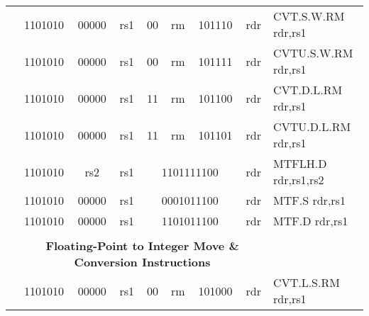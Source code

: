\begin{table}[p]
\begin{small}
\begin{center}
\begin{tabular}{rcccccccccccl}
&
\multicolumn{2}{|c|}{1101010} &
\multicolumn{1}{c|}{00000} &
\multicolumn{1}{c|}{rs1} &
\multicolumn{1}{c|}{00} &
\multicolumn{2}{c|}{rm} &
\multicolumn{3}{c|}{101110} &
\multicolumn{1}{c|}{rdr} & CVT.S.W.RM rdr,rs1 \\
\cline{2-12}
  

&
\multicolumn{2}{|c|}{1101010} &
\multicolumn{1}{c|}{00000} &
\multicolumn{1}{c|}{rs1} &
\multicolumn{1}{c|}{00} &
\multicolumn{2}{c|}{rm} &
\multicolumn{3}{c|}{101111} &
\multicolumn{1}{c|}{rdr} & CVTU.S.W.RM rdr,rs1 \\
\cline{2-12}
  

&
\multicolumn{2}{|c|}{1101010} &
\multicolumn{1}{c|}{00000} &
\multicolumn{1}{c|}{rs1} &
\multicolumn{1}{c|}{11} &
\multicolumn{2}{c|}{rm} &
\multicolumn{3}{c|}{101100} &
\multicolumn{1}{c|}{rdr} & CVT.D.L.RM rdr,rs1 \\
\cline{2-12}
  

&
\multicolumn{2}{|c|}{1101010} &
\multicolumn{1}{c|}{00000} &
\multicolumn{1}{c|}{rs1} &
\multicolumn{1}{c|}{11} &
\multicolumn{2}{c|}{rm} &
\multicolumn{3}{c|}{101101} &
\multicolumn{1}{c|}{rdr} & CVTU.D.L.RM rdr,rs1 \\
\cline{2-12}
  

&
\multicolumn{2}{|c|}{1101010} &
\multicolumn{1}{c|}{rs2} &
\multicolumn{1}{c|}{rs1} &
\multicolumn{6}{c|}{1101111100} &
\multicolumn{1}{c|}{rdr} & MTFLH.D rdr,rs1,rs2 \\
\cline{2-12}
  

&
\multicolumn{2}{|c|}{1101010} &
\multicolumn{1}{c|}{00000} &
\multicolumn{1}{c|}{rs1} &
\multicolumn{6}{c|}{0001011100} &
\multicolumn{1}{c|}{rdr} & MTF.S rdr,rs1 \\
\cline{2-12}
  

&
\multicolumn{2}{|c|}{1101010} &
\multicolumn{1}{c|}{00000} &
\multicolumn{1}{c|}{rs1} &
\multicolumn{6}{c|}{1101011100} &
\multicolumn{1}{c|}{rdr} & MTF.D rdr,rs1 \\
\cline{2-12}
  

&
\multicolumn{11}{c}{} & \\
&
\multicolumn{11}{c}{\bf Floating-Point to Integer Move \& Conversion Instructions} & \\
\cline{2-12}
  

&
\multicolumn{2}{|c|}{1101010} &
\multicolumn{1}{c|}{00000} &
\multicolumn{1}{c|}{rs1} &
\multicolumn{1}{c|}{00} &
\multicolumn{2}{c|}{rm} &
\multicolumn{3}{c|}{101000} &
\multicolumn{1}{c|}{rdr} & CVT.L.S.RM rdr,rs1 \\
\cline{2-12}
  


\end{tabular}
\end{center}
\end{small}
\end{table}
